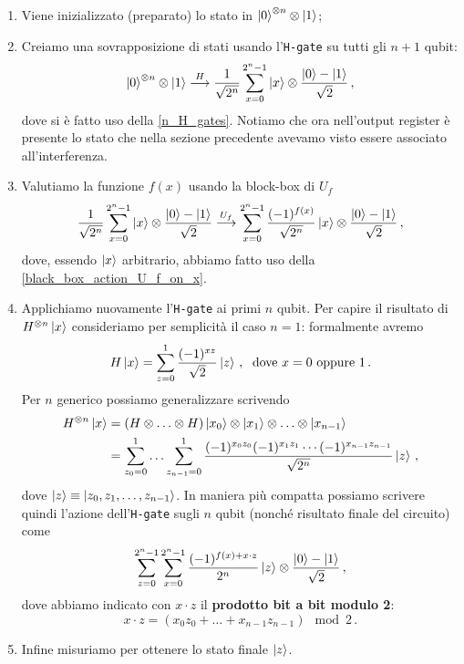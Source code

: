 \begin{enumerate}
    \item Viene inizializzato (preparato) lo stato in $\ket{0}^{\otimes n} \otimes \ket{1}$;
    \item Creiamo una sovrapposizione di stati usando l'\texttt{H-gate} su tutti gli $n+1$ qubit:
        \begin{equation*}
            \ket{0}^{\otimes n} \otimes \ket{1} \overset{H}{\longrightarrow} \frac{1}{\sqrt {2^n}}\sum_{x=0}^{2^n-1}\ket x \otimes \frac{\ket 0 - \ket 1}{\sqrt 2} \, ,
        \end{equation*}
        dove si è fatto uso della \eqref{n_H_gates}. Notiamo che ora nell'output register è presente lo stato che nella sezione precedente avevamo visto essere associato all'interferenza. 
    \item Valutiamo la funzione $f(x)$ usando la block-box di $U_f$
        \begin{equation*}
            \frac{1}{\sqrt {2^n}}\sum_{x=0}^{2^n-1}\ket x \otimes \frac{\ket 0 - \ket 1}{\sqrt 2} \overset{U_f}{\longrightarrow} \sum_{x=0}^{2^n-1}\frac{(-1)^{f(x)}}{\sqrt{2^n}}\ket x \otimes \frac{\ket 0 - \ket 1}{\sqrt 2} \, ,
        \end{equation*}
        dove, essendo $\ket{x}$ arbitrario, abbiamo fatto uso della \eqref{black_box_action_U_f_on_x}. 
    \item Applichiamo nuovamente l'\texttt{H-gate} ai primi $n$ qubit. Per capire il risultato di $H^{\otimes n} \ket{x}$ consideriamo per semplicità il caso $n=1$: formalmente avremo 
    \begin{equation*}
        H \ket{x} = \sum_{z = 0}^1 \frac{(-1)^{xz}}{\sqrt{2}} \ket{z} \, , \; \text{ dove } x = 0 \text{ oppure } 1 \, .
    \end{equation*}
    Per $n$ generico possiamo generalizzare scrivendo
    \begin{align*}
        H^{\otimes n} \ket{x} &= (H \otimes \ldots \otimes H) \ket{x_0} \otimes \ket{x_1} \otimes \ldots \otimes \ket{x_{n-1}} \\
        &= \sum_{z_0=0}^1 \ldots \sum_{z_{n-1}=0}^1 \frac{(-1)^{x_0 z_0} (-1)^{x_1 z_1} \cdots (-1)^{x_{n-1} z_{n-1}}}{\sqrt{2^n}} \ket{z} \, ,
    \end{align*}
    dove $\ket{z} \equiv \ket{z_0, z_1, \ldots, z_{n-1}}$. In maniera più compatta possiamo scrivere quindi l'azione dell'\texttt{H-gate} sugli $n$ qubit (nonché risultato finale del circuito) come
        \begin{equation}\label{output_Deutsch_Jozsa}
            \sum_{z = 0}^{2^n-1} \sum_{x = 0}^{2^n-1} \frac{(-1)^{f(x) + x \cdot z}}{2^n}\ket z \otimes \frac{\ket 0 - \ket 1}{\sqrt 2} \, ,
        \end{equation}
        dove abbiamo indicato con $x\cdot z$ il \textbf{prodotto bit a bit modulo 2}:
        \begin{equation*}
            x\cdot z = (x_0z_0 + \ldots + x_{n-1}z_{n-1}) \mod{2} \, .
        \end{equation*}
    \item Infine misuriamo per ottenere lo stato finale $\ket{z}$. 
\end{enumerate}

